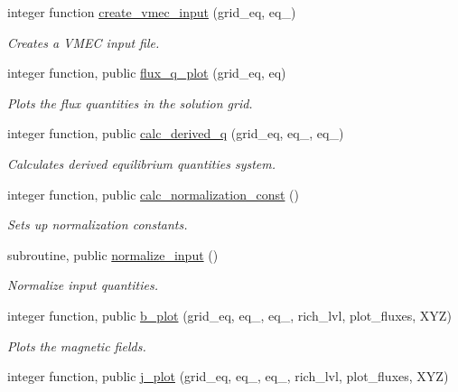 \begin{DoxyCompactItemize}
\item 
integer function \hyperlink{namespaceeq__ops_a9addef683b3d4a8c587510e4c994ec61}{create\+\_\+vmec\+\_\+input} (grid\+\_\+eq, eq\+\_)
\begin{DoxyCompactList}\small\item\em Creates a V\+M\+EC input file. \end{DoxyCompactList}\item 
integer function, public \hyperlink{namespaceeq__ops_af0effe20188d46a44680c2648e4572e9}{flux\+\_\+q\+\_\+plot} (grid\+\_\+eq, eq)
\begin{DoxyCompactList}\small\item\em Plots the flux quantities in the solution grid. \end{DoxyCompactList}\item 
integer function, public \hyperlink{namespaceeq__ops_a087e08ce6d8ad381b5bac8fc51148d50}{calc\+\_\+derived\+\_\+q} (grid\+\_\+eq, eq\+\_, eq\+\_)
\begin{DoxyCompactList}\small\item\em Calculates derived equilibrium quantities system. \end{DoxyCompactList}\item 
integer function, public \hyperlink{namespaceeq__ops_a7cd38586e386e1bc684a327ebcc4c1de}{calc\+\_\+normalization\+\_\+const} ()
\begin{DoxyCompactList}\small\item\em Sets up normalization constants. \end{DoxyCompactList}\item 
subroutine, public \hyperlink{namespaceeq__ops_a1b4c764da73624722d7e76498a2b80a9}{normalize\+\_\+input} ()
\begin{DoxyCompactList}\small\item\em Normalize input quantities. \end{DoxyCompactList}\item 
integer function, public \hyperlink{namespaceeq__ops_a73a8c3cea1e8a636b4978bc626e0fab0}{b\+\_\+plot} (grid\+\_\+eq, eq\+\_, eq\+\_, rich\+\_\+lvl, plot\+\_\+fluxes, X\+YZ)
\begin{DoxyCompactList}\small\item\em Plots the magnetic fields. \end{DoxyCompactList}\item 
integer function, public \hyperlink{namespaceeq__ops_afabdf28e5c26ceb87e6eb8cf3809919d}{j\+\_\+plot} (grid\+\_\+eq, eq\+\_, eq\+\_, rich\+\_\+lvl, plot\+\_\+fluxes, X\+YZ)

\end{DoxyCompactItemize}
